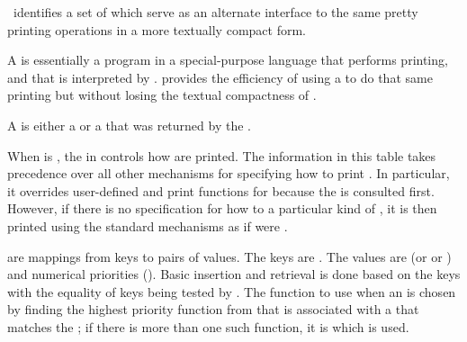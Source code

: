 \Thenextfigure\ identifies a set of  which serve
as an alternate interface to the same pretty printing operations in a 
more textually compact form.

 

\endsubsubsection%


A  is essentially a program in a special-purpose language
that performs printing, and that is interpreted by .
 provides the efficiency of using a  
to do that same printing but without losing the textual compactness of .

A  is either a  or a 
that was returned by the .

\endsubsubsection%

 
When  is , the 
in  controls how 
are printed.  The information in this table takes precedence over all other
mechanisms for specifying how to print .  In particular, it
overrides user-defined   
and print functions for  because the 
is consulted first.  However, if there is no specification for how to 
 a particular kind of , 
it is then printed using the standard mechanisms as if
 were .

 are mappings from keys to pairs of values.  
The keys are .  
The values are 
(or  or \nil) and numerical priorities ().
Basic insertion and retrieval is done based on the keys with the equality
of keys being tested by .
The function to use when  an  is chosen
by finding the highest priority function from  
that is associated with a  that matches the ;
if there is more than one such function, 
it is  which is used.

